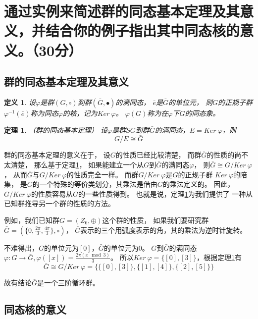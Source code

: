 \documentclass[12pt,onecolumn]{article}
\theoremstyle{plain}
\newtheorem{definition}{定义}[section]
\newtheorem{theorem}{定理}[section]
\begin{document}
\section{通过实例来简述群的同态基本定理及其意义，并结合你的例子指出其中同态核的意义。（30分）}

\subsection{群的同态基本定理及其意义}

\begin{definition}
 设$\varphi$是群$(G, \circ)$到群$(\bar{G}, \bullet)$的满同态，
 $\bar{e}$是$\bar{G}$的单位元，
 则$G$的正规子群$\varphi^{-1}(\bar{e})$称为同态$\varphi$的核，记为$Ker~\varphi$。
 $\varphi(G)$称为在$\varphi$下$G$的同态象。
\end{definition}

\begin{theorem}{（群的同态基本定理）}
 \label{theo:homomorphism}
 设$\varphi$是群$SG$到群$\bar{G}$的满同态，$E = Ker~ \varphi$，则
 \[
 G / E \cong \bar{G}
 \]
\end{theorem}

群的同态基本定理的意义在于，
设$G$的性质已经比较清楚，
而群$\bar{G}$的性质的尚不太清楚，
那么基于定理\ref{theo:homomorphism}，
如果能建立一个从$G$到$\bar{G}$的满同态$\varphi$，
则$\bar{G} \cong G / Ker~\varphi$，
从而$\bar{G}$与$G / Ker~ \varphi$的性质完全一样。
而群$G / Ker~\varphi$是$G$的正规子群 $Ker~\varphi$的陪集，
是$G$的一个特殊的等价类划分，其乘法是借由$G$的乘法定义的。
因此，$G / Ker~\varphi$的性质容易从$G$的一些性质得到。
也就是说，定理\ref{theo:homomorphism}为我们提供了
一种从已知群推导另一个群的性质的方法。

例如，我们已知群$G = (Z_6, \oplus)$这个群的性质，
如果我们要研究群$\bar{G} = (\{0, \frac{2\pi}{3}, \frac{4\pi}{3}\}, \circ)$，
$\bar{G}$表示的三个用弧度表示的角，其的乘法为逆时针旋转。

不难得出，$G$的单位元为$[0]$，$\bar{G}$的单位元为$0$。
$G$到$\bar{G}$的满同态$\varphi: G \to \bar{G},
\varphi([x]) = \frac{2\pi (x\mod 3)}{3}$。
所以$Ker~\varphi = \{[0], [3]\}$，根据定理\ref{theo:homomorphism}有
\[
  \bar{G} \cong G / Ker~\varphi = \{\{[0], [3]\}, \{[1], [4]\}, \{[2], [5]\}\}
\]

故有结论$\bar{G}$是一个三阶循环群。

\subsection{同态核的意义}
\end{document}
